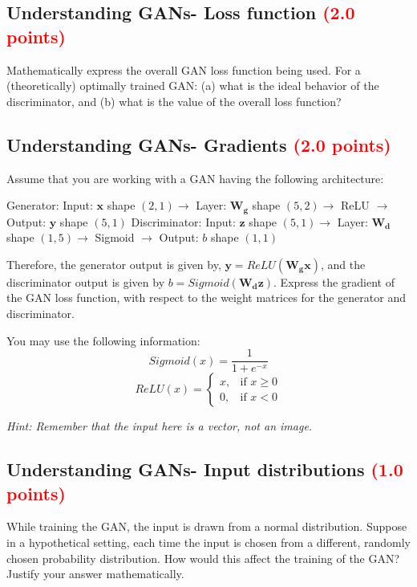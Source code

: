 \documentclass[answers]{exam}
\newcommand{\mypoints}[1]{\textcolor{red}{(#1 points)}}
\begin{document}
\subsection{Understanding GANs- Loss function \mypoints{2.0}}
Mathematically express the overall GAN loss function being used. For a (theoretically) optimally trained GAN: (a) what is the ideal behavior of the discriminator, and (b) what is the value of the overall loss function?
\begin{solution}
\vspace{2cm} %
\end{solution}

\subsection{Understanding GANs- Gradients \mypoints{2.0}}
Assume that you are working with a GAN having the following architecture:

Generator: Input: $\mathbf{x}$ shape $(2,1) \rightarrow$ Layer: $\mathbf{W_g}$ shape $(5,2) \rightarrow$ ReLU $\rightarrow$ Output: $\mathbf{y}$ shape $(5,1)$
Discriminator: Input: $\mathbf{z}$ shape $(5,1) \rightarrow$ Layer: $\mathbf{W_d}$ shape $(1,5) \rightarrow$ Sigmoid $\rightarrow$ Output: $b$ shape $(1,1)$

Therefore, the generator output is given by, $\mathbf{y} = ReLU(\mathbf{W_g}\mathbf{x})$, and the discriminator output is given by $b = Sigmoid(\mathbf{W_d}\mathbf{z})$.
Express the gradient of the GAN loss function, with respect to the weight matrices for the generator and discriminator. 


You may use the following information: 
\begin{equation*}
    Sigmoid(x) = \frac{1}{1+e^{-x}}
\end{equation*}
\begin{equation*}
    ReLU(x)=\begin{cases}
			x, & \text{if $x  \geq 0$}\\
            0, & \text{if $x<0$}
		 \end{cases}
\end{equation*}

\textit{Hint: Remember that the input here is a vector, not an image.}

\begin{solution}
\vspace{2cm} %
\end{solution}

\subsection{Understanding GANs- Input distributions \mypoints{1.0}}
While training the GAN, the input is drawn from a normal distribution. Suppose in a hypothetical setting, each time the input is chosen from a different, randomly chosen probability distribution. How would this affect the training of the GAN? Justify your answer mathematically.
\begin{solution}
\vspace{2cm} %
\end{solution}
% 
% 
\end{document}
